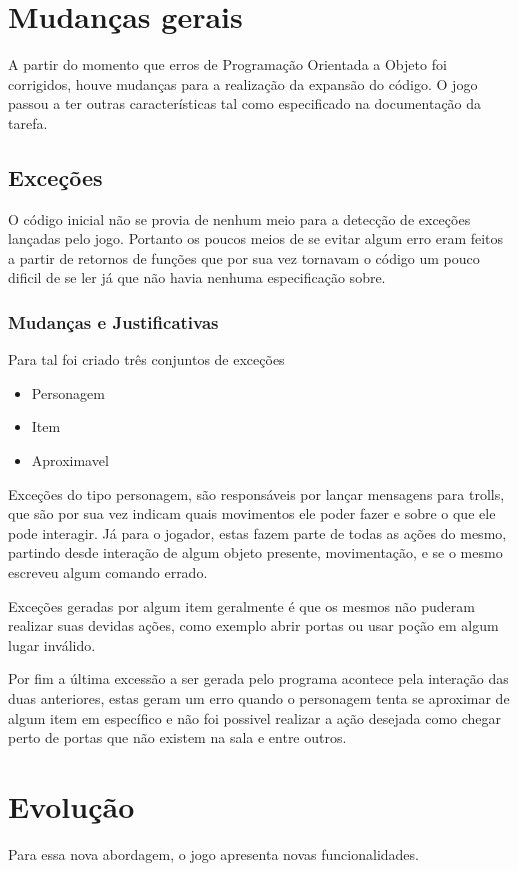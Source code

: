 \documentclass[runningheads,a4paper]{llncs}
\begin{document}
\section{Mudanças gerais}

	A partir do momento que erros de Programação Orientada a Objeto foi corrigidos, houve mudanças para a realização da expansão do código. O jogo passou a ter outras características tal como especificado na documentação da tarefa.

	\subsection{Exceções}
		O código inicial não se provia de nenhum meio para a detecção de exceções lançadas pelo jogo. Portanto os poucos meios de se evitar algum erro eram feitos a partir de retornos de funções que por sua vez tornavam o código um pouco dificil de se ler já que não havia nenhuma especificação sobre.

	\subsubsection{Mudanças e Justificativas}
		Para tal foi criado três conjuntos de exceções
		\begin{itemize}
			\item Personagem
			\item Item
			\item Aproximavel
		\end{itemize}

		Exceções do tipo personagem, são responsáveis por lançar mensagens para trolls, que são por sua vez indicam quais movimentos ele poder fazer e sobre o que ele pode interagir. Já para o jogador, estas fazem parte de todas as ações do mesmo, partindo desde interação de algum objeto presente, movimentação, e se o mesmo escreveu algum comando errado.
		
		Exceções geradas por algum item geralmente é que os mesmos não puderam realizar suas devidas ações, como exemplo abrir portas ou usar poção em algum lugar inválido.
		
		Por fim a última excessão a ser gerada pelo programa acontece pela interação das duas anteriores, estas geram um erro quando o personagem tenta se aproximar de algum item em específico e não foi possivel realizar a ação desejada como chegar perto de portas que não existem na sala e entre outros.

\section{Evolução}
	Para essa nova abordagem, o jogo apresenta novas funcionalidades.
	
\end{document}
